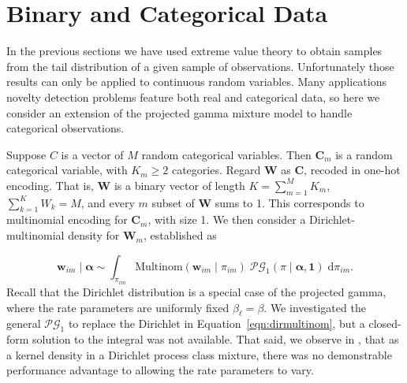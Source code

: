 \section{Binary and Categorical Data\label{sec:categorical}}
In the previous sections we have used extreme value theory to obtain samples
    from the tail distribution of a given sample of observations. Unfortunately 
    those results can only be applied to continuous random variables.  Many 
    applications novelty detection problems feature both real and categorical 
    data, so here we consider an extension of the projected gamma mixture model 
    to handle categorical observations. 

Suppose $C$ is a vector of $M$ random categorical variables.  Then $\bm{C}_{m}$ 
    is a random categorical variable, with $K_{m} \geq 2$ categories. Regard 
    $\bm{W}$ as $\bm{C}$, recoded in one-hot encoding.  That is, $\bm{W}$ is a 
    binary vector of length $K = \sum_{m = 1}^M K_{m}$, 
    $\sum_{k = 1}^K W_k = M$, and every $m$ subset of $\bm{W}$ sums to 1.  This 
    corresponds to multinomial encoding for $\bm{C}_m$, with size 1. We then 
    consider a Dirichlet-multinomial density for $\bm{W}_m$, established as 

    \begin{equation}
        \label{eqn:dirmultinom}
        \bm{w}_{im}\mid\bm{\alpha} 
        \sim 
        \int_{\pi_{im}} 
        \text{Multinom}(\bm{w}_{im}\mid\pi_{im})\;
        \mathcal{PG}_1(\pi\mid\bm{\alpha},\bm{1})\;\text{d}\pi_{im}.
    \end{equation}
    Recall that the Dirichlet distribution is a special case of the projected 
    gamma, where the rate parameters are uniformly fixed $\beta_{\ell} = \beta$.  
    We investigated the general $\mathcal{PG}_1$ to replace the Dirichlet in 
    Equation~\ref{eqn:dirmultinom}, but a closed-form solution to the integral 
    was not available.  That said, we observe in \cite{trubey:pg}, that as a 
    kernel density in a Dirichlet process class mixture, there was no 
    demonstrable performance advantage to allowing the rate parameters to vary.
 
